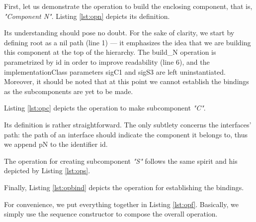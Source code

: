 		
	First, let us demonstrate the \textsf{operation} to build the enclosing \textsf{component}, that is,
	\textit{"Component N"}. Listing \ref{lst:opn} depicts its definition.	
	
		
	
	\noindent Its understanding should pose no doubt. For the sake of clarity, we start by defining 
	\textsf{root} as a \textsf{nil} \textsf{path} (line 1) --- it emphasizes the idea that we are building
	this component at the top of the hierarchy. The \textsf{build\_N} operation is parametrized by \textsf{id} in
	order to improve readability (line 6), and the \textsf{implementationClass} parameters \textsf{sigC1} and
	\textsf{sigS3} are left uninstantiated. Moreover, it should be noted that at this point
	we cannot establish the \textsf{binding}s as the sub\textsf{component}s are yet to be made.
	
			Listing \ref{lst:opc} depicts the \textsf{operation} to make sub\textsf{component} \textit{"C"}.	
		
		
	
	\noindent Its definition is rather straightforward.	The only subtlety concerns the \textsf{interface}s' \textsf{path}:
	the \textsf{path} of an \textsf{interface} should indicate the \textsf{component} it belongs to, thus we append
	\textsf{pN} to the \textsf{identifier} \textsf{id}.
	
		The \textsf{operation} for creating sub\textsf{component} \textit{"S"} follows the same spirit and his depicted
		by Listing \ref{lst:ops}.	
	
		
	
	Finally, Listing \ref{lst:opbind} depicts the \textsf{operation} for establishing the \textsf{binding}s.
	
			
	
	For convenience, we put everything together in Listing \ref{lst:opf}. Basically, we simply use the sequence constructor
	to compose the overall \textsf{operation}.
	
